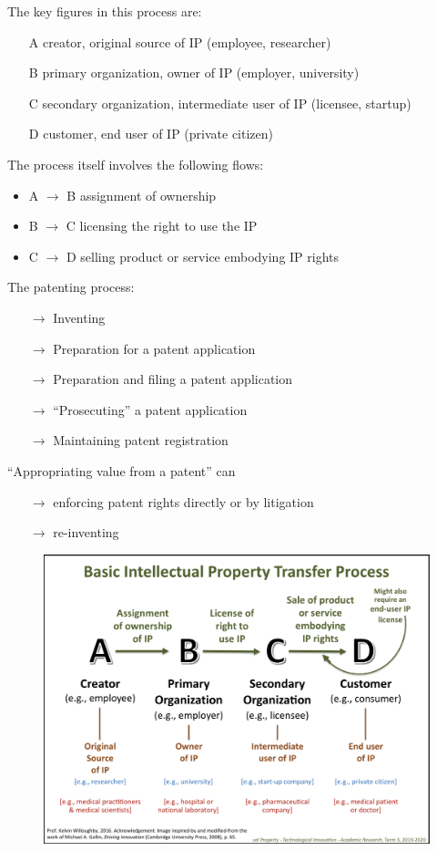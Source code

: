 \documentclass[10pt,a4paper,twocolumn]{article}
\begin{document}
The key figures in this process are:
\begin{itemize}
  \item[A] creator, original source of IP (employee, researcher)
  \item[B] primary organization, owner of IP (employer, university)
  \item[C] secondary organization, intermediate user of IP (licensee, startup)
  \item[D] customer, end user of IP (private citizen)
\end{itemize}
The process itself involves the following flows:
\begin{itemize}
  \item A $\longrightarrow$ B assignment of ownership
  \item B $\longrightarrow$ C licensing the right to use the IP
  \item C $\longrightarrow$ D selling product or service embodying IP rights
\end{itemize}
The patenting process:
\begin{itemize}
  \item[$\longrightarrow$] Inventing
  \item[$\longrightarrow$] Preparation for a patent application
  \item[$\longrightarrow$] Preparation and filing a patent application
  \item[$\longrightarrow$] ``Prosecuting'' a patent application
  \item[$\longrightarrow$] Maintaining patent registration
\end{itemize}
``Appropriating value from a patent'' can
\begin{itemize}
  \item[$\longrightarrow$] enforcing patent rights directly or by litigation
  \item[$\longrightarrow$] re-inventing
\end{itemize}
\begin{figure}
  \centering
  \includegraphics[width=\columnwidth]{basic_ip_transfer.png}
\end{figure}
\end{document}
